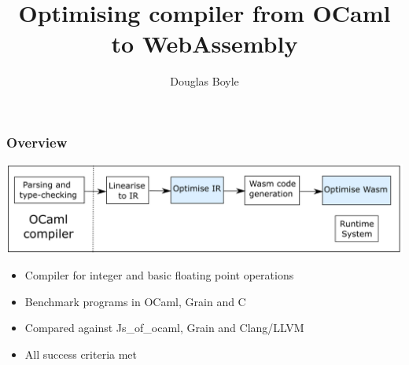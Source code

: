 \documentclass{beamer}
\title[]{Optimising compiler from OCaml to WebAssembly} %
\author{Douglas Boyle} %
\date{\formatdate{16}{2}{2021}} %
\begin{document}
\begin{frame}
\titlepage %
\end{frame}



\begin{frame}\frametitle{Overview} 
\includegraphics[scale=0.37]{overview}
\begin{itemize}
\item Compiler for integer and basic floating point operations
\item Benchmark programs in OCaml, Grain and C
\item Compared against Js\_of\_ocaml, Grain and Clang/LLVM
\item All success criteria met
\end{itemize}
\end{frame}
\end{document}
